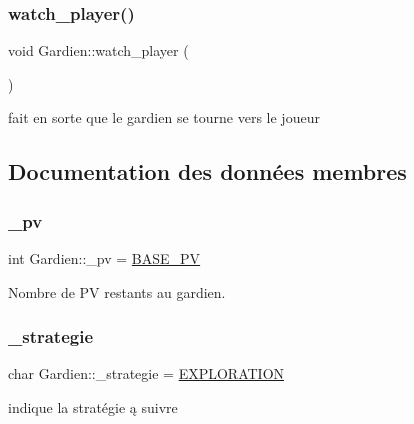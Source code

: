 \subsubsection{\texorpdfstring{watch\+\_\+player()}{watch\_player()}}
{\footnotesize\ttfamily void Gardien\+::watch\+\_\+player (\begin{DoxyParamCaption}{ }\end{DoxyParamCaption})\hspace{0.3cm}{\ttfamily [private]}}



fait en sorte que le gardien se tourne vers le joueur 



\subsection{Documentation des données membres}
\mbox{\label{classGardien_a252683c50522c13f9604bea387d1af34}} 
\subsubsection{\texorpdfstring{\+\_\+pv}{\_pv}}
{\footnotesize\ttfamily int Gardien\+::\+\_\+pv = \hyperlink{classGardien_a1832c02b32c6e47b240536fd6ba47812}{B\+A\+S\+E\+\_\+\+PV}\hspace{0.3cm}{\ttfamily [private]}}



Nombre de PV restants au gardien. 

\mbox{\label{classGardien_ac3a196e3f722dd3f18895a73b92949c4}} 
\subsubsection{\texorpdfstring{\+\_\+strategie}{\_strategie}}
{\footnotesize\ttfamily char Gardien\+::\+\_\+strategie = \hyperlink{Gardien_8h_aa319d22141059c1da948546b4f32e640}{E\+X\+P\+L\+O\+R\+A\+T\+I\+ON}\hspace{0.3cm}{\ttfamily [private]}}



indique la stratégie ą suivre 

\mbox{\label{classGardien_a7e6143b00deafef1608eac95bead20ce}} 
